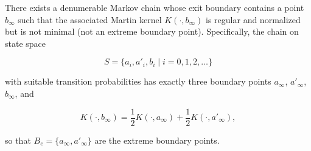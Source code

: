 There exists a denumerable Markov chain whose exit boundary contains a point $b_\infty$ such that the associated Martin kernel $K(\cdot, b_\infty)$ is regular and normalized but is not minimal (not an extreme boundary point). Specifically, the chain on state space

$$S = \{a_i, a'_i, b_i \mid i = 0, 1, 2, \ldots\}$$

with suitable transition probabilities has exactly three boundary points $a_\infty$, $a'_\infty$, $b_\infty$, and

$$K(\cdot, b_\infty) = \frac{1}{2}K(\cdot, a_\infty) + \frac{1}{2}K(\cdot, a'_\infty),$$

so that $B_e = \{a_\infty, a'_\infty\}$ are the extreme boundary points.
